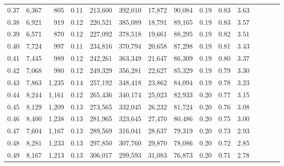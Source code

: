 \begin{tabular}{rrrcrrrrrrrrrrr}
0.37 &   6,367 &     805 &                                       0.11 &  213,600 &  392,010 &   17,872 &   90,084 &  0.19 &  0.83 &                         3.63 \\
0.38 &   6,921 &     919 &                                       0.12 &  220,521 &  385,089 &   18,791 &   89,165 &  0.19 &  0.83 &                         3.57 \\
0.39 &   6,571 &     870 &                                       0.12 &  227,092 &  378,518 &   19,661 &   88,295 &  0.19 &  0.82 &                         3.51 \\
0.40 &   7,724 &     997 &                                       0.11 &  234,816 &  370,794 &   20,658 &   87,298 &  0.19 &  0.81 &                         3.43 \\
0.41 &   7,445 &     989 &                                       0.12 &  242,261 &  363,349 &   21,647 &   86,309 &  0.19 &  0.80 &                         3.37 \\
0.42 &   7,068 &     980 &                                       0.12 &  249,329 &  356,281 &   22,627 &   85,329 &  0.19 &  0.79 &                         3.30 \\
0.43 &   7,863 &   1,235 &                                       0.14 &  257,192 &  348,418 &   23,862 &   84,094 &  0.19 &  0.78 &                         3.23 \\
0.44 &   8,244 &   1,161 &                                       0.12 &  265,436 &  340,174 &   25,023 &   82,933 &  0.20 &  0.77 &                         3.15 \\
0.45 &   8,129 &   1,209 &                                       0.13 &  273,565 &  332,045 &   26,232 &   81,724 &  0.20 &  0.76 &                         3.08 \\
0.46 &   8,400 &   1,238 &                                       0.13 &  281,965 &  323,645 &   27,470 &   80,486 &  0.20 &  0.75 &                         3.00 \\
0.47 &   7,604 &   1,167 &                                       0.13 &  289,569 &  316,041 &   28,637 &   79,319 &  0.20 &  0.73 &                         2.93 \\
0.48 &   8,281 &   1,233 &                                       0.13 &  297,850 &  307,760 &   29,870 &   78,086 &  0.20 &  0.72 &                         2.85 \\
0.49 &   8,167 &   1,213 &                                       0.13 &  306,017 &  299,593 &   31,083 &   76,873 &  0.20 &  0.71 &                         2.78 \\

\end{tabular}
